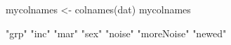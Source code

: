 \begin{Schunk}
\begin{Sinput}
     mycolnames <- colnames(dat)
     mycolnames
\end{Sinput}
\begin{Soutput}
[1] "grp"       "inc"       "mar"       "sex"       "noise"     "moreNoise" "newed"    
\end{Soutput}
\end{Schunk}
